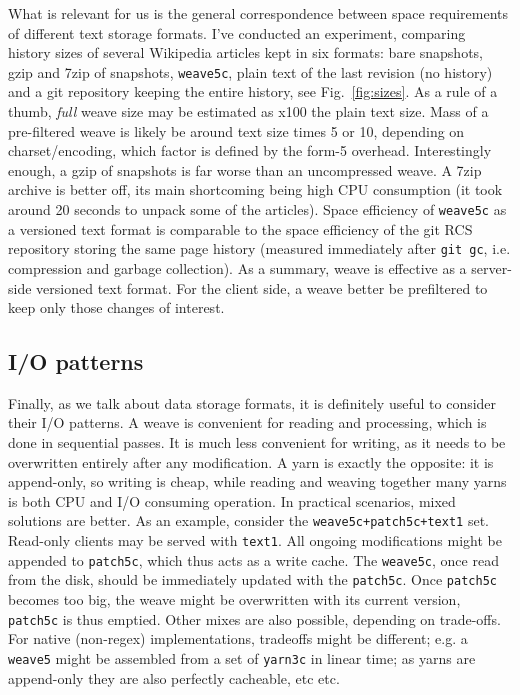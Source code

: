 \documentclass{acm_proc_article-sp}
\begin{document}
What is relevant for us is the general correspondence between space requirements of different text storage formats.
I've conducted an experiment, comparing history sizes of several Wikipedia articles kept in six formats: bare snapshots, gzip and 7zip of snapshots, {\tt weave5c}, plain text of the last revision (no history) and a git repository keeping the entire history, see Fig.~\ref{fig:sizes}.
As a rule of a thumb, \emph{full} weave size may be estimated as x100 the plain text size.
Mass of a pre-filtered weave is likely be around text size times 5 or 10, depending on charset/encoding, which factor is defined by the form-5 overhead.
Interestingly enough, a gzip of snapshots is far worse than an uncompressed weave.
A 7zip archive is better off, its main shortcoming being high CPU consumption (it took around 20 seconds to unpack some of the articles).
Space efficiency of {\tt weave5c} as a versioned text format is comparable to the space efficiency of the git RCS repository storing the same page history (measured immediately after \verb+git gc+, i.e. compression and garbage collection).
As a summary, weave is effective as a server-side versioned text format. 
For the client side, a weave better be prefiltered to keep only those changes of interest.

\subsection{I/O patterns}	\label{sec:io}

Finally, as we talk about data storage formats, it is definitely useful to consider their I/O patterns.
A weave is convenient for reading and processing, which is done in sequential passes.
It is much less convenient for writing, as it needs to be overwritten entirely after any modification.
A yarn is exactly the opposite: it is append-only, so writing is cheap, while reading and weaving together many yarns is both CPU and I/O consuming operation.
In practical scenarios, mixed solutions are better.
As an example, consider the {\tt weave5c+patch5c+text1} set.
Read-only clients may be served with {\tt text1}.
All ongoing modifications might be appended to {\tt patch5c}, which thus acts as a write cache.
The {\tt weave5c}, once read from the disk, should be immediately  updated with the {\tt patch5c}.
Once {\tt patch5c} becomes too big, the weave might be overwritten with its current version, {\tt patch5c} is thus emptied.
Other mixes are also possible, depending on trade-offs.
For native (non-regex) implementations, tradeoffs might be different; e.g. a {\tt weave5} might be assembled from a set of {\tt yarn3c} in linear time; as yarns are append-only they are also perfectly cacheable, etc etc.
\end{document}
